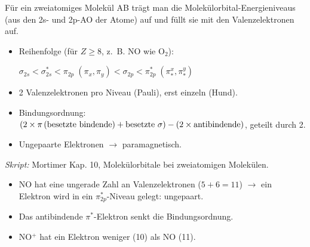 

F\"ur ein zweiatomiges Molek\"ul AB tr\"agt man die
Molek\"ulorbital-Energieniveaus (aus den 2s- und 2p-AO der Atome) auf und
f\"ullt sie mit den Valenzelektronen auf.

\begin{werkzeugkasten}
\begin{itemize}
  \item Reihenfolge (f\"ur $Z\geq 8$, z.~B. NO wie O$_2$):
        \begin{center}
        $\sigma_{2s} < \sigma^*_{2s} < \pi_{2p} \;(\pi_x,\pi_y)<
         \sigma_{2p} < \pi^*_{2p} \;(\pi^x_*,\pi^y_*)$
        \end{center}
  \item 2 Valenzelektronen pro Niveau (Pauli), erst einzeln (Hund).
  \item Bindungsordnung: $(2\times\text{$\pi$\,(besetzte bindende)}+
        \text{besetzte $\sigma$}) - (2\times\text{antibindende})$, geteilt
        durch 2.
  \item Ungepaarte Elektronen $\rightarrow$ paramagnetisch.
\end{itemize}
\textit{Skript:} Mortimer Kap. 10, Molek\"ulorbitale bei zweiatomigen
Molek\"ulen.
\end{werkzeugkasten}

\begin{achtung}
\begin{itemize}
  \item NO hat eine ungerade Zahl an Valenzelektronen ($5+6 = 11$)
        $\rightarrow$ ein Elektron wird in ein
        $\pi^*_{2p}$-Niveau gelegt: ungepaart.
  \item Das antibindende $\pi^*$-Elektron senkt die Bindungsordnung.
  \item NO$^+$ hat ein Elektron weniger (10) als NO (11).
\end{itemize}
\end{achtung}
